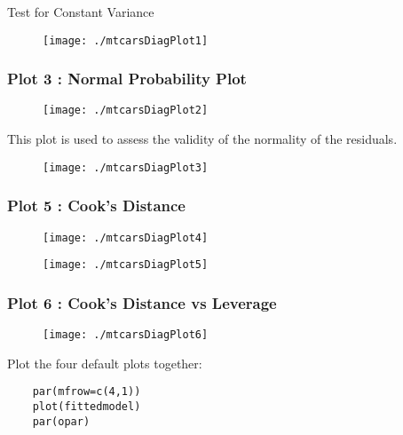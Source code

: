 \documentclass[residuals.tex]{subfiles}
\begin{document}
Test for Constant Variance
\begin{figure}[h!]
	\centering
	\texttt{[image: ./mtcarsDiagPlot1]}
	
	\label{mtcarsDiagPlot1}
\end{figure}

\newpage
\subsubsection*{Plot 3 : Normal Probability Plot}
\begin{figure}[h!]
	\centering
	\texttt{[image: ./mtcarsDiagPlot2]}
	
	\label{mtcarsDiagPlot2}
\end{figure}

\newpage
This plot is used to assess the validity of the normality of the residuals.
\begin{figure}[h!]
	\centering
	\texttt{[image: ./mtcarsDiagPlot3]}
	
	\label{mtcarsDiagPlot3}
\end{figure}

\newpage
\subsubsection*{Plot 5 :  Cook's Distance}
\begin{figure}[h!]
	\centering
	\texttt{[image: ./mtcarsDiagPlot4]}
	
	\label{mtcarsDiagPlot4}
\end{figure}

\newpage

\begin{figure}[h!]
	\centering
	\texttt{[image: ./mtcarsDiagPlot5]}
	
	\label{mtcarsDiagPlot5}
\end{figure}
\newpage

\subsubsection*{Plot 6 :  Cook's Distance vs Leverage}
\begin{figure}[h!]
	\centering
	\texttt{[image: ./mtcarsDiagPlot6]}
	
	\label{mtcarsDiagPlot6}
\end{figure}

\newpage
Plot the four default plots together:
\begin{framed}
	\begin{verbatim}
	par(mfrow=c(4,1))
	plot(fittedmodel)
	par(opar)
	\end{verbatim}
\end{framed}

\end{document}
